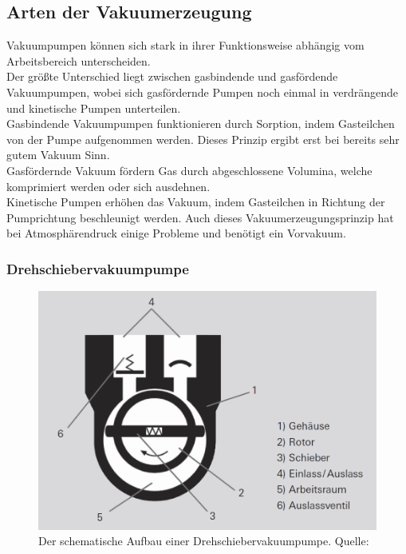 	\subsection{Arten der Vakuumerzeugung}	
		
		\noindent
		Vakuumpumpen können sich stark in ihrer Funktionsweise abhängig vom Arbeitsbereich unterscheiden.\\	
		Der größte Unterschied liegt zwischen gasbindende und gasfördende Vakuumpumpen, wobei sich gasfördernde Pumpen noch einmal in verdrängende und kinetische Pumpen unterteilen.\\
		Gasbindende Vakuumpumpen funktionieren durch Sorption, indem Gasteilchen von der Pumpe aufgenommen werden. 
		Dieses Prinzip ergibt erst bei bereits sehr gutem Vakuum Sinn.  \\
		Gasfördernde Vakuum fördern Gas durch abgeschlossene Volumina, welche komprimiert werden oder sich ausdehnen.\\
		Kinetische Pumpen erhöhen das Vakuum, indem Gasteilchen in Richtung der Pumprichtung beschleunigt werden.
		Auch dieses Vakuumerzeugungsprinzip hat bei Atmosphärendruck einige Probleme und benötigt ein Vorvakuum.

		\subsubsection{Drehschiebervakuumpumpe} 
						
			\begin{figure}
				\centering
				\includegraphics[width=0.5\linewidth]{"latex/images/Drehschieber.png"}
				\caption{Der schematische Aufbau einer Drehschiebervakuumpumpe. \protect Quelle: \cite{pfeiffer:pump}}
				\label{fig:dreh}
			\end{figure}  

